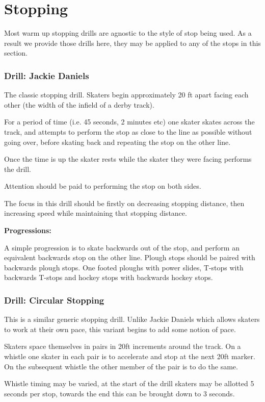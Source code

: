 \chapter{Stopping}
\label{ch:stopping}



Most warm up stopping drills are agnostic to the style of stop being used. 
As a result we provide those drills here, they may be applied to any of the stops in this section.  

 

\subsection*{Drill: Jackie Daniels} 
\label{drill:stopping/jackie_daniels}


The classic stopping drill.
Skaters begin approximately 20 ft apart facing each other (the width of the infield of a derby track).

For a period of time (i.e. 45 seconds, 2 minutes etc) one skater skates across the track, and attempts to perform the stop as close to the line as possible without going over, before skating back and repeating the stop on the other line.   

Once the time is up the skater rests while the skater they were facing performs the drill. 

Attention should be paid to performing the stop on both sides.  


The focus in this drill should be firstly on decreasing stopping distance, then increasing speed while maintaining that stopping distance.

{\bf Progressions:}

A simple progression is to skate backwards out of the stop, and perform an equivalent backwards stop on the other line.
Plough stops should be paired with backwards plough stops. One footed ploughs with power slides, T-stops with backwards T-stops and hockey stops with backwards hockey stops.


\subsection*{Drill: Circular Stopping}
\label{drill:stopping/circular}

This is a similar generic stopping drill.  
Unlike Jackie Daniels which allows skaters to work at their own pace, this variant begins to add some notion of pace.


Skaters space themselves in pairs in 20ft increments around the track. 
On a whistle one skater in each pair is to accelerate and stop at the next 20ft marker. 
On the subsequent whistle the other member of the pair is to do the same. 

Whistle timing may be varied, at the start of the drill skaters may be allotted 5 seconds per stop, towards the end this can be brought down to 3 seconds. 
